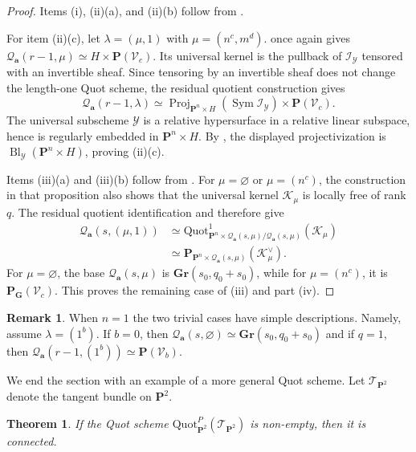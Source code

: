 \documentclass[leqno,11pt,a4paper]{amsart}
\newtheorem{thm}{Theorem}[section]
\theoremstyle{definition}
\newtheorem{remark}[remark]{Remark}
\numberwithin{equation}{section}
\newcommand{\Gr}{\mathbf{Gr}}
\newcommand{\bfa}{\mathbf{a}}
\newcommand{\Quot}{\mathrm{Quot}}
\newcommand{\PP}{\mathbf{P}}
\newcommand{\II}{\mathscr{I}}
\newcommand{\QQ}{\mathcal{Q}}
\newcommand{\YY}{\mathcal{Y}}
\DeclareMathOperator{\Proj}{Proj}
\DeclareMathOperator{\Sym}{Sym}
\DeclareMathOperator{\Bl}{Bl}
\begin{document}
\begin{proof}
Items (i), (ii)(a), and (ii)(b) follow from .

For item (ii)(c), let $\lambda=(\mu,1)$ with $\mu=(n^c,m^d)$.
 once again gives $\QQ_{\bfa}(r-1,\mu)\simeq H\times\PP(\mathscr V_c)$.
Its universal kernel is the pullback of $\II_{\mathcal Y}$ tensored with an invertible sheaf.
Since tensoring by an invertible sheaf does not change the length-one Quot scheme, the residual quotient construction gives
$$
\QQ_{\bfa}(r-1,\lambda) \simeq \Proj_{\PP^n\times H}(\Sym\II_{\YY}) \times\PP(\mathscr V_c).
$$
The universal subscheme $\YY$ is a relative hypersurface in a relative linear subspace, hence is regularly embedded in $\PP^n\times H$.
By \cite[Proposition~2.2]{Kleiman81}, the displayed projectivization is $\Bl_{\YY}(\PP^n\times H)$, proving (ii)(c).

Items (iii)(a) and (iii)(b) follow from .
For $\mu=\varnothing$ or $\mu=(n^c)$, the construction in that proposition also shows that the universal
kernel $\mathscr K_\mu$ is locally free of rank $q$.
The residual quotient identification and \cite[Proposition 2.2]{Kleiman90} therefore give
\begin{align*}
\QQ_{\bfa}(s,(\mu,1))
&\simeq \Quot^1_{\PP^n\times\QQ_{\bfa}(s,\mu)/\QQ_{\bfa}(s,\mu)}(\mathscr K_\mu)\\
&\simeq \PP_{\PP^n\times\QQ_{\bfa}(s,\mu)}
(\mathscr K_\mu^\vee).
\end{align*}
For $\mu=\varnothing$, the base $\QQ_{\bfa}(s,\mu)$ is $\Gr(s_0,q_0+s_0)$, while for $\mu=(n^c)$, it is $\PP_{\mathbf G}(\mathscr V_c)$.
This proves the remaining case of (iii) and part (iv).
\end{proof}

\begin{remark} When $n=1$ the two trivial cases have simple descriptions. Namely, assume $\lambda=(1^b)$.
If $b=0$, then $\QQ_{\bfa}(s,\varnothing) \simeq\Gr(s_0,q_0+s_0)$ and if $q=1$, then
$\QQ_{\bfa}(r-1,(1^b))\simeq\PP(\mathscr{V}_b)$.
\end{remark}

We end the section with an example of a more general Quot scheme. 
Let $\mathscr{T}_{\PP^2}$ denote the tangent bundle on $\PP^2$.


\begin{thm} \label{connected_tan}
If the Quot scheme $\Quot^P_{\PP^2}(\mathscr{T}_{\PP^2})$ is non-empty, then it is connected.
\end{thm}
\end{document}

